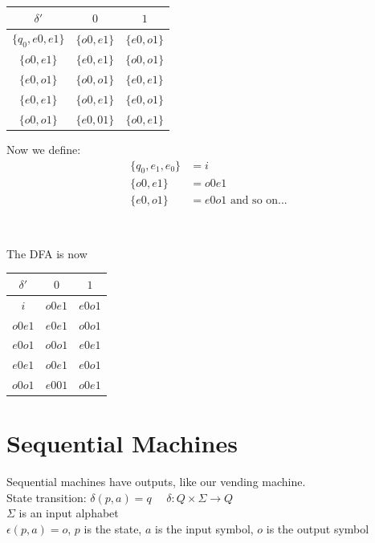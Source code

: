 \documentclass{scrartcl}
\begin{document}
\begin{center}
\begin{tabular} {|c|c c|}
\hline
$\delta'$&$0$&$1$\\
\hline
$\{q_0,e0,e1\}$ & $\{o0,e1\}$ & $\{e0,o1\}$\\
$\{o0,e1\}$ & $\{e0,e1\}$ & $\{o0,o1\}$\\
$\{e0,o1\}$ & $\{o0,o1\}$ & $\{e0,e1\}$\\
$\{e0,e1\}$ & $\{o0,e1\}$ & $\{e0,o1\}$\\
$\{o0,o1\}$ & $\{e0,01\}$ & $\{o0,e1\}$\\
\hline
\end{tabular}
\end{center}
Now we define:
\begin{align*}
\{q_0,e_1,e_0\} &= i\\
\{o0,e1\} &= o0e1\\
\{e0,o1\} &= e0o1 \text{  and so on...}\\
\end{align*}\ \\\ \\

The DFA is now

\begin{center}
\begin{tabular} {|c|c c|}
\hline
$\delta'$&$0$&$1$\\
\hline
$i$ & $o0e1$ & $e0o1$\\
$o0e1$ & $e0e1$ & $o0o1$\\
$e0o1$ & $o0o1$ & $e0e1$\\
$e0e1$ & $o0e1$ & $e0o1$\\
$o0o1$ & $e001$ & $o0e1$\\
\hline
\end{tabular}
\end{center}

\section{Sequential Machines}
Sequential machines have outputs, like our vending machine.\\
State transition: $\delta(p,a)=q$ \ \ $\delta : Q \times \Sigma \rightarrow Q$\\
$\Sigma$ is an input alphabet\\
$\epsilon(p,a)=o$, $p$ is the state, $a$ is the input symbol, $o$ is the output symbol\\
\end{document}
